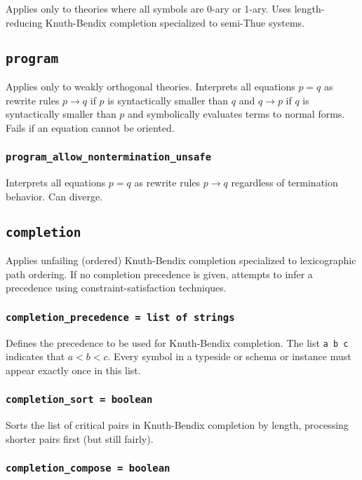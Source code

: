 \documentclass[10pt]{book}
\begin{document}
Applies only to theories where all symbols are 0-ary or 1-ary.  Uses length-reducing Knuth-Bendix completion specialized to semi-Thue systems.

\subsection{{\tt program}}

Applies only to weakly orthogonal theories.  Interprets all equations $p = q$ as rewrite rules $p \to q$ if $p$ is syntactically smaller than $q$ and $q \to p$ if $q$ is syntactically smaller than $p$ and symbolically evaluates terms to normal forms.  Fails if an equation cannot be oriented.

\subsubsection{{\tt program\_allow\_nontermination\_unsafe}}

Interprets all equations $p = q$ as rewrite rules $p \to q$ regardless of termination behavior.  Can diverge.

\subsection{{\tt completion}}

Applies unfailing (ordered) Knuth-Bendix completion specialized to lexicographic path ordering.  If no completion precedence is given, attempts to infer a precedence using constraint-satisfaction techniques.

\subsubsection{{\tt completion\_precedence = list of strings}}

Defines the precedence to be used for Knuth-Bendix completion.  The list {\tt a b c} indicates that $a < b < c$.  Every symbol in a typeside or schema or instance must appear exactly once in this list.

\subsubsection{{\tt completion\_sort = boolean}}

Sorts the list of critical pairs in Knuth-Bendix completion by length, processing shorter pairs first (but still fairly).

\subsubsection{{\tt completion\_compose = boolean}}
\end{document}
